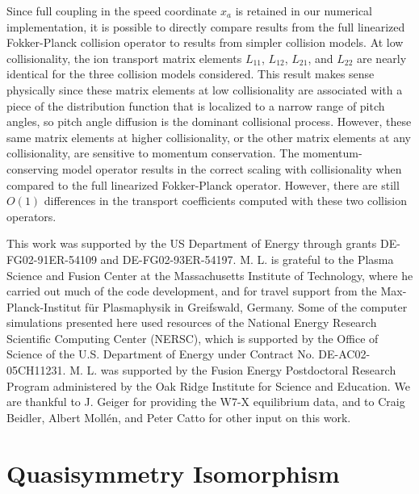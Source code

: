 \documentclass[12pt]{revtex4}
\begin{document}
Since full coupling in the speed coordinate $x_{a}$ is retained in our numerical
implementation, it is possible to directly compare results from the full linearized
Fokker-Planck collision operator to results from simpler collision models.
At low collisionality, the ion transport matrix elements $L_{11}$,
$L_{12}$, $L_{21}$, and $L_{22}$ are nearly identical for the three collision models
considered. This result makes sense physically since these matrix elements at low collisionality
are associated with a piece of the distribution function that is localized to a narrow range of pitch angles,
so pitch angle diffusion is the dominant collisional process.
However, these same matrix elements at higher collisionality, or the other matrix elements
at any collisionality, are sensitive to momentum conservation.
The momentum-conserving model operator results in the correct scaling with collisionality
when compared to the full linearized Fokker-Planck operator.
However, there are still $O(1)$ differences in the transport coefficients
computed with these two collision operators.




\begin{acknowledgments}
This work was supported by the US Department of Energy through grants DE-FG02-91ER-54109 and DE-FG02-93ER-54197.
M. L. is grateful to the Plasma Science and Fusion Center at the Massachusetts Institute of Technology,
where he carried out much of the code development, and for travel support from the
Max-Planck-Institut f\"{u}r Plasmaphysik in Greifswald, Germany.
Some of the computer simulations presented here
used resources of the National Energy Research Scientific Computing Center (NERSC),
which is supported by the Office of Science of the U.S. Department of Energy under Contract No. DE-AC02-05CH11231.
M. L. was supported by the
Fusion Energy Postdoctoral Research Program
administered by the Oak Ridge Institute for Science and Education.
We are thankful to J. Geiger for providing the W7-X equilibrium data,
and to Craig Beidler, Albert Moll\'{e}n, and Peter Catto for other input on this work.
\end{acknowledgments}


\appendix
\section{Quasisymmetry Isomorphism}
\end{document}
